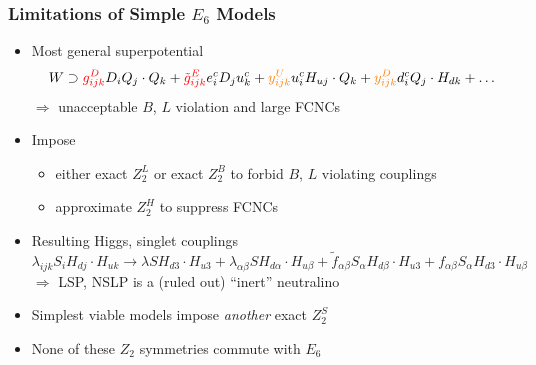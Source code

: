 \documentclass[10pt,aspectratio=169]{beamer}
\begin{document}
\begin{frame}
  \frametitle{Limitations of Simple $E_6$ Models}
  \begin{itemize}\itemsep0.8em
  \item Most general superpotential
    \begin{equation*}
      W \supset {\color{red} g_{ijk}^D} D_i Q_j \cdot Q_k
      + {\color{red} \tilde{g}_{ijk}^E} e_i^c D_j u_k^c
      + {\color{orange} y_{ijk}^U} u_i^c H_{uj} \cdot Q_k
      + {\color{orange} y_{ijk}^D} d_i^c Q_j \cdot
      H_{dk} + \ldots
    \end{equation*}
    $\Rightarrow$ {\color{red} unacceptable $B$, $L$ violation} and
        {\color{orange} large FCNCs}
      \item Impose
        \begin{itemize}
          \item either exact $Z_2^L$ or exact $Z_2^B$ to forbid
            $B$, $L$ violating couplings
          \item approximate $Z_2^H$ to suppress FCNCs
        \end{itemize}
    \item Resulting Higgs, singlet couplings
      \begin{equation*}
        \lambda_{ijk} S_i H_{dj} \cdot H_{uk}
        \rightarrow \lambda S H_{d3} \cdot H_{u3}
        + \lambda_{\alpha\beta} S H_{d\alpha} \cdot
        H_{u\beta} + \tilde{f}_{\alpha\beta} S_\alpha
        H_{d\beta} \cdot H_{u3} + f_{\alpha\beta}
        S_\alpha H_{d3} \cdot H_{u\beta}
      \end{equation*}
      $\Rightarrow$ LSP, NSLP is a (ruled out) ``inert'' neutralino
    \item Simplest viable models impose \emph{another} exact $Z_2^S$
    \item \alert{None of these $Z_2$ symmetries commute with $E_6$}
  \end{itemize}
\end{frame}
\end{document}
